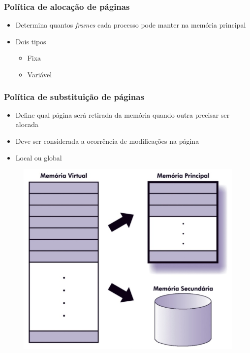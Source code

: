\documentclass[aspectratio=169,
				xcolor=table]{beamer}
\begin{document}
	\begin{frame}
		\frametitle{Política de alocação de páginas}
		
		\begin{itemize}
			\item Determina quantos \textit{frames} cada processo pode manter na memória principal
			\vspace{1em}
			\item Dois tipos
			\begin{itemize}
				\item Fixa
				\item Variável
			\end{itemize}
			
		\end{itemize}
	\end{frame}
	
	\begin{frame}
		\frametitle{Política de substituição de páginas}
		\begin{itemize}
			\item Define qual página será retirada da memória quando outra precisar ser alocada
			\vspace{1em}
			\item Deve ser considerada a ocorrência de modificações na página
			\vspace{1em}
			\item Local ou global
			
		\end{itemize}
		\begin{figure}[hbtp]
		\centering
		\includegraphics[height=0.4\textheight, keepaspectratio]{../figs/cap09/enderecamento2.png}
		\end{figure}
	\end{frame}
	
\end{document}
